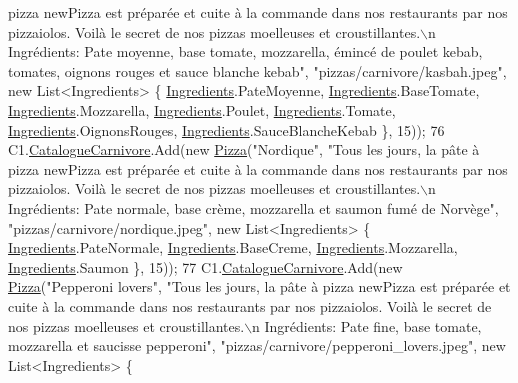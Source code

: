 \begin{DoxyCode}
{       pizza newPizza est préparée et cuite à la commande dans nos restaurants par nos pizzaiolos. Voilà le secret
       de nos pizzas moelleuses et croustillantes.\(\backslash\)n Ingrédients: Pate moyenne, base tomate, mozzarella, émincé de
       poulet kebab, tomates, oignons rouges et sauce blanche kebab"}, \textcolor{stringliteral}{"pizzas/carnivore/kasbah.jpeg"}, \textcolor{keyword}{new} 
      List<Ingredients> \{ \hyperlink{namespaceModele_a001a8e89e56a724f24a249ba98080d41}{Ingredients}.PateMoyenne, \hyperlink{namespaceModele_a001a8e89e56a724f24a249ba98080d41}{Ingredients}.BaseTomate, 
      \hyperlink{namespaceModele_a001a8e89e56a724f24a249ba98080d41}{Ingredients}.Mozzarella, \hyperlink{namespaceModele_a001a8e89e56a724f24a249ba98080d41}{Ingredients}.Poulet, \hyperlink{namespaceModele_a001a8e89e56a724f24a249ba98080d41}{Ingredients}.Tomate, 
      \hyperlink{namespaceModele_a001a8e89e56a724f24a249ba98080d41}{Ingredients}.OignonsRouges, \hyperlink{namespaceModele_a001a8e89e56a724f24a249ba98080d41}{Ingredients}.SauceBlancheKebab \}, 15));
76             C1.\hyperlink{classModele_1_1Catalogue_a4af9ef768f67cef6dfe545e22a6d63af}{CatalogueCarnivore}.Add(\textcolor{keyword}{new} \hyperlink{classModele_1_1Pizza}{Pizza}(\textcolor{stringliteral}{"Nordique"}, \textcolor{stringliteral}{"Tous les jours, la pâte
       à pizza newPizza est préparée et cuite à la commande dans nos restaurants par nos pizzaiolos. Voilà le
       secret de nos pizzas moelleuses et croustillantes.\(\backslash\)n Ingrédients: Pate normale, base crème, mozzarella et saumon
       fumé de Norvège"}, \textcolor{stringliteral}{"pizzas/carnivore/nordique.jpeg"}, \textcolor{keyword}{new} List<Ingredients> \{ 
      \hyperlink{namespaceModele_a001a8e89e56a724f24a249ba98080d41}{Ingredients}.PateNormale, \hyperlink{namespaceModele_a001a8e89e56a724f24a249ba98080d41}{Ingredients}.BaseCreme, 
      \hyperlink{namespaceModele_a001a8e89e56a724f24a249ba98080d41}{Ingredients}.Mozzarella, \hyperlink{namespaceModele_a001a8e89e56a724f24a249ba98080d41}{Ingredients}.Saumon \}, 15));
77             C1.\hyperlink{classModele_1_1Catalogue_a4af9ef768f67cef6dfe545e22a6d63af}{CatalogueCarnivore}.Add(\textcolor{keyword}{new} \hyperlink{classModele_1_1Pizza}{Pizza}(\textcolor{stringliteral}{"Pepperoni lovers"}, \textcolor{stringliteral}{"Tous les jours,
       la pâte à pizza newPizza est préparée et cuite à la commande dans nos restaurants par nos pizzaiolos. Voilà
       le secret de nos pizzas moelleuses et croustillantes.\(\backslash\)n Ingrédients: Pate fine, base tomate, mozzarella et
       saucisse pepperoni"}, \textcolor{stringliteral}{"pizzas/carnivore/pepperoni\_lovers.jpeg"}, \textcolor{keyword}{new} List<Ingredients> \{ 

\end{DoxyCode}
